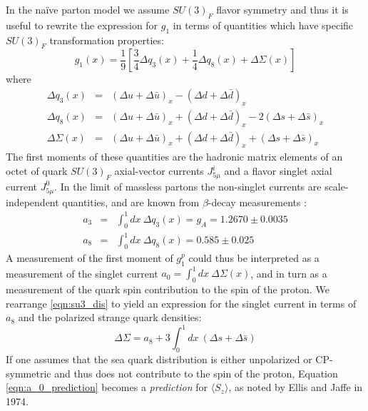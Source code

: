 In the na\"ive parton model we assume $SU(3)_F$ flavor symmetry and thus it is
useful to rewrite the expression for $g_1$ in terms of quantities which have
specific $SU(3)_F$ transformation properties:
%
\begin{equation}
  g_1(x) = \frac{1}{9}[\frac{3}{4}\Delta q_3(x) + \frac{1}{4}\Delta q_8(x) + \Delta \Sigma(x)]
  \label{eqn:g1}
\end{equation}
%
where
%
\begin{eqnarray}
  \Delta q_3(x) & = & (\Delta u + \Delta \bar{u})_x - (\Delta d + \Delta \bar{d})_x \nonumber \\
  \Delta q_8(x) & = & (\Delta u + \Delta \bar{u})_x + (\Delta d + \Delta \bar{d})_x - 2(\Delta s + \Delta \bar{s})_x \nonumber \\
  \Delta \Sigma(x) & = & (\Delta u + \Delta \bar{u})_x + (\Delta d + \Delta \bar{d})_x + (\Delta s + \Delta \bar{s})_x
  \label{eqn:su3_dis}
\end{eqnarray}
%
The first moments of these quantities are the hadronic matrix elements of an
octet of quark $SU(3)_F$ axial-vector currents $J_{5\mu}^i$ and a flavor
singlet axial current $J_{5\mu}^0$. In the limit of massless partons
the non-singlet currents are scale-independent quantities, and are known from
$\beta$-decay measurements \cite{}:
%
\begin{eqnarray}
  a_3 & = & \int_0^1 dx~\Delta q_3(x) = g_A = 1.2670 \pm 0.0035 \nonumber \\
  a_8 & = & \int_0^1 dx~\Delta q_8(x) = 0.585 \pm 0.025
  \label{eqn:beta-decay}
\end{eqnarray} %
%
A measurement of the first moment of $g_1^p$ could thus be interpreted as a
measurement of the singlet current $a_0 = \int_0^1 dx~\Delta \Sigma (x)$, and
in turn as a measurement of the quark spin contribution to the spin of the
proton. We rearrange \ref{eqn:su3_dis} to yield an expression for the singlet
current in terms of $a_8$ and the polarized strange quark densities:
%
\begin{equation}
  \Delta \Sigma = a_8 + 3 \int_0^1 dx~(\Delta s + \Delta \bar s)
  \label{eqn:a_0_prediction}
\end{equation}
%
If one assumes that the sea quark distribution is either unpolarized or
CP-symmetric and thus does not contribute to the spin of the proton, Equation
\ref{eqn:a_0_prediction} becomes a \textit{prediction} for $\langle S_z
\rangle$, as noted by Ellis and Jaffe \cite{Ellis:1973kp} in 1974.

